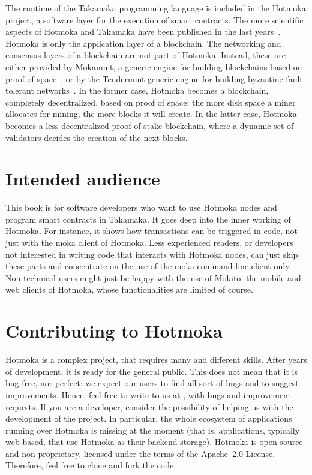 The runtime of the Takamaka programming language
is included in the Hotmoka project, a software layer for the
execution of smart contracts.
The more scientific aspects of Hotmoka and Takamaka have been published
in the last years~\cite{BeniniGMS21,CrosaraOST21,CrosaraOST23,OlivieriST21,Spoto19,Spoto20,SpotoMGB23}.
Hotmoka is only the application layer of a blockchain. The networking and
consensus layers of a blockchain are not part of Hotmoka. Instead, these
are either provided by Mokamint, a generic engine for building blockchains
based on proof of space~\cite{Spoto25}, or by the Tendermint generic engine
for building byzantine fault-tolerant networks~\cite{Kwon14}.
In the former case, Hotmoka becomes a blockchain, completely decentralized,
based on proof of space: the more disk space a miner allocates for mining, the
more blocks it will create. In the latter case, Hotmoka becomes a less
decentralized proof of
stake blockchain, where a dynamic set of validators decides the creation
of the next blocks.

\section{Intended audience}

This book is for software developers who want to use Hotmoka nodes and program smart contracts in Takamaka.
It goes deep into the inner working of Hotmoka. For instance, it shows how transactions can be
triggered in code, not just with the moka client of Hotmoka. Less experienced readers, or
developers not interested in writing code that interacts with Hotmoka nodes, can just skip these
parts and concentrate on the use of the moka command-line client only. Non-technical users might
just be happy with the use of Mokito, the mobile and web clients of Hotmoka, whose
functionalities are limited of course.

\section{Contributing to Hotmoka}

Hotmoka is a complex project, that requires many and different skills. After years of development,
it is ready for the general public. This does not mean that it is bug-free, nor perfect:
we expect our users to find all sort of bugs and to suggest improvements. Hence, feel
free to write to us at \faustoEmail{}, with bugs and improvement requests.
If you are a developer, consider the possibility of helping us with the development
of the project. In particular, the whole ecosystem of applications running
over Hotmoka is missing at the moment (that is, applications, typically web-based, that
use Hotmoka as their backend storage). Hotmoka is open-source and non-proprietary,
licensed under the terms of the Apache~2.0 License. Therefore, feel free to clone and fork the code.

